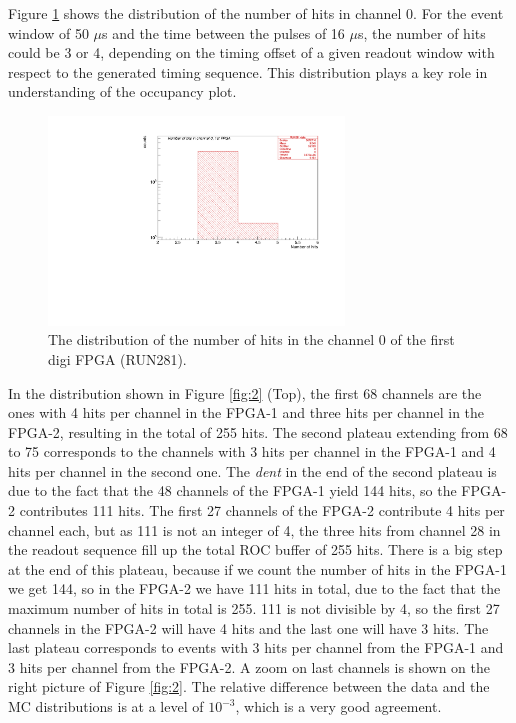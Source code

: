 Figure \ref{fig:66} shows the distribution of the number of hits in channel 0.
For the event window of 50 $\mu$s and the time between the pulses of 16 $\mu$s,
the number of hits could be 3 or 4,
depending on the timing offset of a given readout window with respect to the generated timing sequence.
This distribution plays a key role in understanding of the occupancy plot.
\begin{figure}[!h]
\centering
\includegraphics[width =0.7\textwidth]{figures/pdf/figure_00066_nhits_ch00_run281.pdf}
\caption{
  The distribution of the number of hits in the channel 0 of the first digi FPGA (RUN281).
}
\label{fig:66}
\end{figure}

In the distribution shown in Figure \ref{fig:2} (Top),
the first 68 channels are the ones with 4 hits per channel in the FPGA-1
and three hits per channel in the FPGA-2, 
resulting in the total of 255 hits.
The second plateau extending from 68 to 75 corresponds to the channels
with 3 hits per channel in the FPGA-1 and 4 hits per channel in the second one.
  The \textit{dent} in the end of the second plateau is due to the fact that the 48 channels of the FPGA-1
  yield 144 hits, so the FPGA-2 contributes 111 hits. The first 27 channels of the FPGA-2 contribute
  4 hits per channel each, but as 111 is not an integer of 4, the three hits from channel 28 in the readout sequence
  fill up the total ROC buffer of 255 hits.
There is a big step at the end of this plateau, because if we count the number of hits
in the FPGA-1 we get 144, so in the FPGA-2 we have 111 hits in total,
due to the fact that the maximum number of hits in total is 255.
111 is not divisible by 4, so the first 27 channels in the FPGA-2 will have 4 hits
and the last one will have 3 hits.
The last plateau corresponds to events with 3 hits per channel from the FPGA-1
and 3 hits per channel from the FPGA-2.
A zoom on last channels is shown on the right picture of Figure \ref{fig:2}.
The relative difference between the data and the MC distributions is at a level of $10^{-3}$,
which is a very good agreement.

